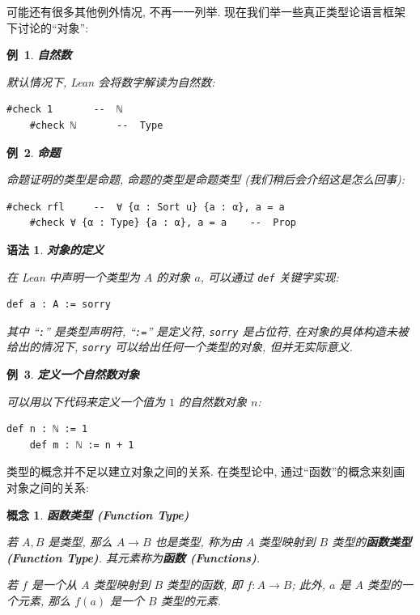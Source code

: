 \documentclass[UTF8]{ctexart}
\DeclareMathOperator{\0}{\mathbf{0}}                    %
\newcommand{\<}{\langle}
\renewcommand{\>}{\rangle}                              %
\newenvironment{dfn_box}{
    \begin{tcolorbox}[enhanced, colback=dfn_green2, boxrule=0pt, frame hidden,
        borderline west={0.7mm}{0.1mm}{dfn_green1},breakable]
    }
    {\end{tcolorbox}}
\newenvironment{thm_box}{
    \begin{tcolorbox}[enhanced, colback=thm_blue2, boxrule=0pt, frame hidden,
        borderline west={0.7mm}{0.1mm}{thm_blue1},breakable]
    }
    {\end{tcolorbox}}
\newenvironment{xmp_box}{
    \begin{tcolorbox}[enhanced, colback=xmp_purple2, boxrule=0pt, frame hidden,
        borderline west={0.7mm}{0.1mm}{xmp_purple1},breakable]
    }
    {\end{tcolorbox}}
\theoremstyle{MyStyle} %
\newtheorem{concept}[definition]{概念}
\newenvironment{cpt}[1]
{
    \begin{dfn_box}
        \begin{concept}
            \textbf{#1}
            \newline
}
{
        \end{concept}
    \end{dfn_box}
}
\newtheorem{syntax}[definition]{语法}
\newenvironment{syn}[1]
{
    \begin{thm_box}
        \begin{syntax}
            \textbf{#1}
            \newline
}
{
        \end{syntax}
    \end{thm_box}
}
\newtheorem{example}{ 例\, }[subsection]
\newenvironment{xmp}[1]
{
    \begin{xmp_box}
        \begin{example}
            \textbf{#1}
            \newline
}
{
        \end{example}
    \end{xmp_box}
}
\newcommand*{\lean}[1]{\texttt{\color{blue}#1}}
\begin{document}
        可能还有很多其他例外情况, 不再一一列举. 现在我们举一些真正类型论语言框架下讨论的``对象'': 

        \begin{xmp}
            {自然数}
            默认情况下, Lean 会将数字解读为自然数: 
            \begin{lstlisting}[style = lean]
    #check 1       --  ℕ
    #check ℕ       --  Type
            \end{lstlisting}
        \end{xmp}

        \begin{xmp}
            {命题}
            命题证明的类型是命题, 命题的类型是命题类型 (我们稍后会介绍这是怎么回事): 
            \begin{lstlisting}[style = lean]
    #check rfl     --  ∀ {α : Sort u} {a : α}, a = a
    #check ∀ {α : Type} {a : α}, a = a    --  Prop
            \end{lstlisting}
        \end{xmp}

        \begin{syn}
            {对象的定义}
            在 Lean 中声明一个类型为 $A$ 的对象 $a$, 可以通过 \lean{def} 关键字实现: 
            \begin{lstlisting}[style=lean]
    def a : A := sorry
            \end{lstlisting}

            其中 ``\texttt{:}'' 是类型声明符, ``\texttt{:=}'' 是定义符, \texttt{\color{red}sorry} 是占位符, 在对象的具体构造未被给出的情况下, \texttt{\color{red}sorry} 可以给出任何一个类型的对象, 但并无实际意义. 
        \end{syn}

        \begin{xmp}
            {定义一个自然数对象}
            可以用以下代码来定义一个值为 $1$ 的自然数对象 $n$: 
            \begin{lstlisting}[style=lean]
    def n : ℕ := 1
    def m : ℕ := n + 1
            \end{lstlisting}
        \end{xmp}

        类型的概念并不足以建立对象之间的关系. 在类型论中, 通过``函数''的概念来刻画对象之间的关系: 

        \begin{cpt}
            {函数类型 (Function Type)}
            若 $A,B$ 是类型, 那么 $A\to B$ 也是类型, 称为由 $A$ 类型映射到 $B$ 类型的\textbf{函数类型 (Function Type)}. 其元素称为\textbf{函数 (Functions)}. 
            
            若 $f$ 是一个从 $A$ 类型映射到 $B$ 类型的函数, 即 $f : A\to B$; 此外, $a$ 是 $A$ 类型的一个元素, 那么 $f(a)$ 是一个 $B$ 类型的元素. 
        \end{cpt}
\end{document}
